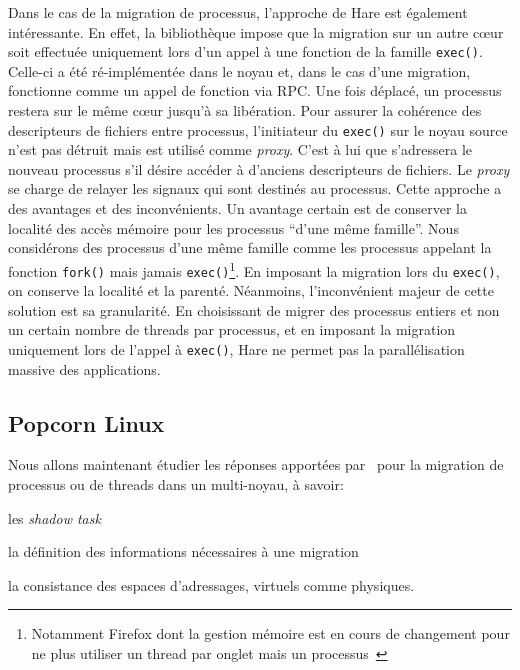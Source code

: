       Dans le cas de la migration de processus, l'approche de Hare est également
      intéressante. En effet, la bibliothèque impose que la migration sur un
      autre c\oe ur soit effectuée uniquement lors d'un appel à une fonction de
      la famille \texttt{exec()}. Celle-ci a été ré-implémentée dans le noyau
      et, dans le cas d'une migration, fonctionne comme un appel de fonction via
      RPC. Une fois déplacé, un
      processus restera sur le même c\oe ur jusqu'à sa libération. Pour assurer
      la cohérence des descripteurs de fichiers entre processus, l'initiateur du
      \texttt{exec()} sur le noyau source n'est pas détruit mais est utilisé
      comme \textit{proxy}. C'est à lui que s'adressera le nouveau processus
      s'il désire accéder à d'anciens descripteurs de fichiers. Le
      \textit{proxy} se charge de relayer les signaux qui sont destinés au
      processus.
      \enlargethispage{1mm} %
      Cette approche a des avantages et des inconvénients. Un avantage certain
      est de conserver la localité des accès mémoire pour les processus ``d'une
      même famille''. Nous considérons des processus d'une même famille comme
      les processus appelant la fonction \texttt{fork()} mais jamais
      \texttt{exec()}\footnote{Notamment Firefox dont la gestion mémoire est en
        cours de changement pour ne plus utiliser un thread par onglet mais un
        processus~\citep{mozillaElectrolysis}}. En imposant la migration lors du
      \texttt{exec()}, on conserve la localité et la parenté. Néanmoins,
      l'inconvénient majeur de cette solution est sa granularité. En choisissant
      de migrer des processus entiers et non un certain nombre de threads par
      processus, et en imposant la migration uniquement lors de l'appel à
      \texttt{exec()}, Hare ne permet pas la parallélisation massive des
      applications.


    \subsection{Popcorn Linux}

      Nous allons maintenant étudier les réponses apportées
      par~\citet{katz2013popcorn} pour la migration de processus ou de threads
      dans un multi-noyau, à savoir: \benumline \item les \textit{shadow
        task} \item la définition des informations nécessaires à une
      migration \item la consistance des espaces d'adressages, virtuels comme
      physiques\eenumline.

